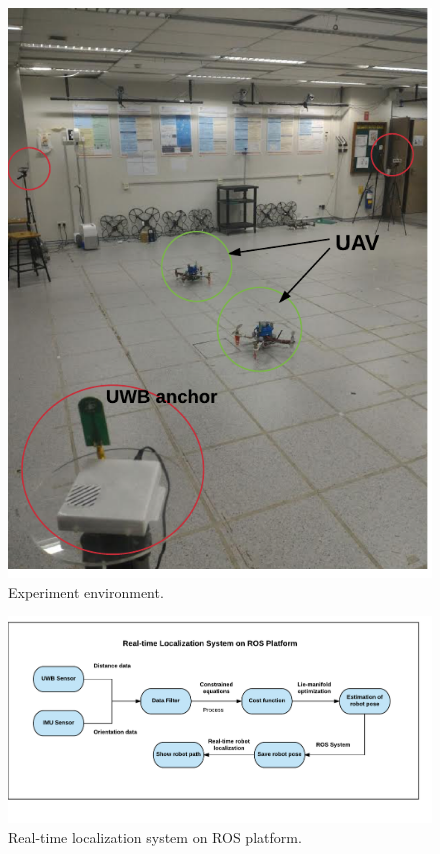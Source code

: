 \documentclass[journal]{IEEEtran}
\begin{document}
\begin{figure}[!t]
	\centering
	\includegraphics[width=1\linewidth]{pic/environment.pdf}
	\caption{Experiment environment.}
	\label{fig6}
\end{figure}

\begin{figure}[!t]
	\centering
	\includegraphics[width=0.8\linewidth]{pic/workflow.pdf}
	\caption{Real-time localization system on ROS platform.}
	\label{fig7}
\end{figure}
\end{document}
